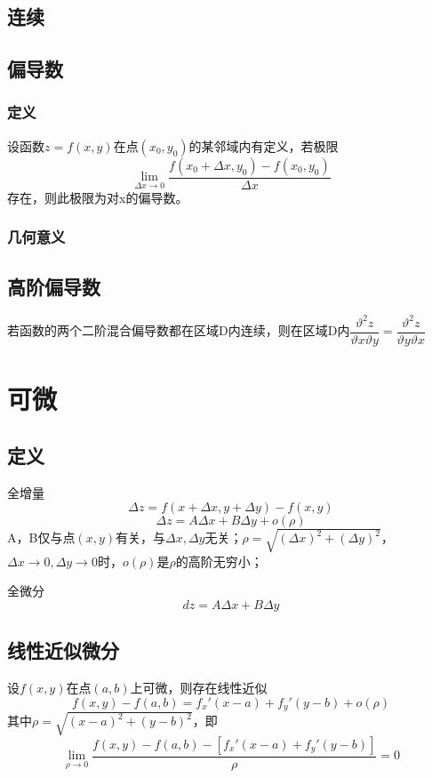 \subsection{连续}


\subsection{偏导数}

\subsubsection{定义}
设函数\(z = f(x, y)\)在点\((x_0, y_0)\)的某邻域内有定义，若极限\[\lim_{\Delta x \to 0}\dfrac{f(x_0 + \Delta x, y_0) - f(x_0, y_0)}{\Delta x}\]
存在，则此极限为对x的偏导数。


\subsubsection{几何意义}


\subsection{高阶偏导数}
若函数的两个二阶混合偏导数都在区域D内连续，则在区域D内\(\dfrac{\vartheta^2z}{\vartheta x\vartheta y} = \dfrac{\vartheta^2z}{\vartheta y\vartheta x}\)


\section{可微}

\subsection{定义}
全增量\[\Delta z = f(x + \Delta x, y + \Delta y) - f(x, y)\]
\[\Delta z = A\Delta x + B\Delta y + o(\rho)\]
A，B仅与点\((x, y)\)有关，与\(\Delta x,\Delta y\)无关；\(\rho = \sqrt{(\Delta x)^2 + (\Delta y)^2}\)，\(\Delta x \to 0,\Delta y \to 0\)时，\(o(\rho)\)是\(\rho\)的高阶无穷小；

全微分\[dz = A\Delta x + B\Delta y\]


\subsection{线性近似微分}
设\(f(x, y)\)在点\((a, b)\)上可微，则存在线性近似\[f(x, y) - f(a, b) = f_x'(x - a) + f_y'(y - b) + o(\rho)\]
其中\(\rho = \sqrt{(x - a)^2 + (y - b)^2}\)，即\[\lim_{\rho \to 0}\dfrac{f(x, y) - f(a, b) - [f_x'(x - a) + f_y'(y - b)]}{\rho} = 0\]


